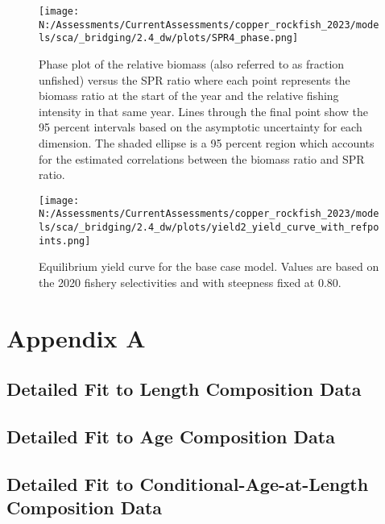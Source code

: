 \documentclass[11pt,
  english,
  letterpaper,
]{article}
\begin{document}
\clearpage

\begin{figure}
\centering
\texttt{[image: N:/Assessments/CurrentAssessments/copper\_rockfish\_2023/models/sca/\_bridging/2.4\_dw/plots/SPR4\_phase.png]}
\caption{Phase plot of the relative biomass (also referred to as fraction unfished) versus the SPR ratio where each point represents the biomass ratio at the start of the year and the relative fishing intensity in that same year. Lines through the final point show the 95 percent intervals based on the asymptotic uncertainty for each dimension. The shaded ellipse is a 95 percent region which accounts for the estimated correlations between the biomass ratio and SPR ratio.\label{fig:phase}}
\end{figure}

\begin{figure}
\centering
\texttt{[image: N:/Assessments/CurrentAssessments/copper\_rockfish\_2023/models/sca/\_bridging/2.4\_dw/plots/yield2\_yield\_curve\_with\_refpoints.png]}
\caption{Equilibrium yield curve for the base case model. Values are based on the 2020 fishery selectivities and with steepness fixed at 0.80.\label{fig:yield}}
\end{figure}

\hypertarget{detailed-fit-comps}{%
\section{Appendix A}\label{detailed-fit-comps}}

\hypertarget{detailed-fit-to-length-composition-data}{%
\subsection{Detailed Fit to Length Composition Data}\label{detailed-fit-to-length-composition-data}}

\hypertarget{detailed-fit-to-age-composition-data}{%
\subsection{Detailed Fit to Age Composition Data}\label{detailed-fit-to-age-composition-data}}

\hypertarget{detailed-fit-to-conditional-age-at-length-composition-data}{%
\subsection{Detailed Fit to Conditional-Age-at-Length Composition Data}\label{detailed-fit-to-conditional-age-at-length-composition-data}}
\end{document}
